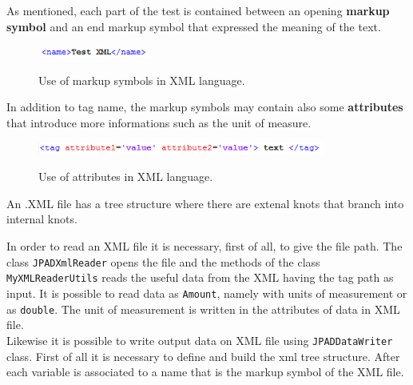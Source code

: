 As mentioned, each part of the test is contained between an opening {\bfseries markup symbol} and an end markup symbol that expressed the meaning of the text.\\

\begin{figure}[H]
\centering
{\includegraphics[height=0.31cm]{Immagini/xml1.jpg}} 
\caption{Use of markup symbols in XML language.}
\end{figure}

In addition to tag name, the markup symbols may contain also some {\bfseries attributes} that introduce more informations such as the unit of measure.\\

\begin{figure}[H]
\centering
{\includegraphics[height=0.4cm]{Immagini/xml2.jpg}} 
\caption{Use of attributes in XML language.}
\end{figure}

An .XML file has a tree structure where there are extenal knots that branch into internal knots.
%

In order to read an XML file it is necessary, first of all, to give the file path. The class \texttt{JPADXmlReader} opens the file and  the methods of the class \texttt{MyXMLReaderUtils} reads the useful data from the XML having the tag path as input. It is possible to read data as \texttt{Amount}, namely with units of measurement or as \texttt{double}. The unit of measurement is written in the attributes of data in XML file.\\ 

Likewise it is possible to write output data on XML file using \texttt{JPADDataWriter} class. First of all it is necessary to define and build the xml tree structure. After each variable is associated to a name that is the markup symbol of the XML file.

